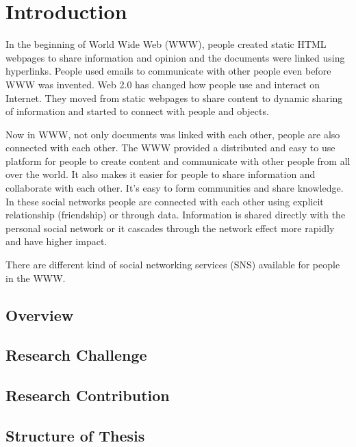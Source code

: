 

\chapter{Introduction} \label{Chapter:Introduction}

In the beginning of World Wide Web (WWW), people created static HTML webpages to share information and opinion and the documents were linked using hyperlinks. People used emails to communicate with other people even before WWW was invented. Web 2.0 has changed how people use and interact on Internet. They moved from static webpages to share content to dynamic sharing of information and started to connect with people and objects.

Now in WWW, not only documents was linked with each other, people are also connected with each other. The WWW provided a distributed and easy to use platform for people to create content and communicate with other people from all over the world. It also makes it easier for people to share information and collaborate with each other. It's easy to form communities and share knowledge. In these social networks people are connected with each other using explicit relationship (friendship) or through data. Information is shared directly with the personal social network or it cascades through the network effect more rapidly and have higher impact.

There are different kind of social networking services (SNS) available for people in the WWW. 




\section{Overview}
\section{Research Challenge}
\section{Research Contribution}
\section{Structure of Thesis}
